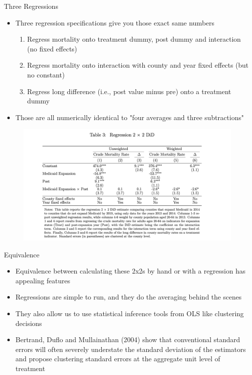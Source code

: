 \documentclass{beamer}
\begin{document}
\begin{frame}{Three Regressions}

\begin{itemize}
\item Three regression specifications give you those exact same numbers
	\begin{enumerate}
	\item Regress mortality onto treatment dummy, post dummy and interaction (no fixed effects)
	\item Regress mortality onto interaction with county and year fixed effects (but no constant)
	\item Regress long difference (i.e., post value minus pre) onto a treatment dummy
	\end{enumerate}
\item Those are all numerically identical to "four averages and three subtractions"
\end{itemize}

\end{frame}

\begin{frame}

\begin{figure}
    \centering
    \includegraphics[height=0.7\textheight]{./lecture_includes/regression2x2.png}
\end{figure}

\end{frame}

\begin{frame}{Equivalence}

\begin{itemize}

\item Equivalence between calculating these 2x2s by hand or with a regression has appealing features
\item Regressions are simple to run, and they do the averaging behind the scenes
\item They also allow us to use statistical inference tools from OLS like clustering decisions
\item  Bertrand, Duflo and Mullainathan (2004) show that conventional standard errors will often severely understate the standard deviation of the estimators and propose clustering standard errors at the aggregate unit level of treatment
\end{itemize}

\end{frame}
\end{document}
